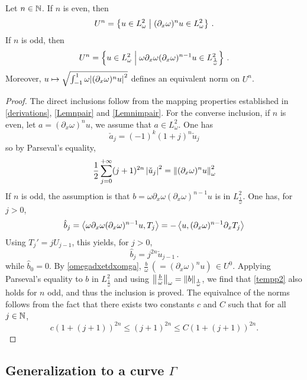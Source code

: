 \documentclass[a4paper]{article}
\begin{document}
\begin{Lem} Let $n \in \mathbb{N}$. If $n$ is even, then
	\[U^n = \left\{u \in L^2_\omega\mathrel{}\middle|\mathrel{}(\partial_x \omega)^n u \in L^2_\omega\right\}\,.\]
	If $n$ is odd, then
	\[U^n = \left\{u \in L^2_\omega\mathrel{}\middle|\mathrel{}\omega \partial_x\omega (\partial_x \omega)^{n-1} u \in L^2_\frac{1}{\omega}\right\}\,.\]	
	Moreover, $u \mapsto \sqrt{\int_{-1}^{1} \omega {\left\lvert ( \partial_x \omega )^nu \right\rvert^2}}$ defines an equivalent norm on $U^n$. 
\end{Lem}
\begin{proof}
	The direct inclusions follow from the mapping properties established in \autoref{derivations}, \autoref{Lemnpair} and \autoref{Lemnimpair}. For the converse inclusion, if $n$ is even, let $a = (\partial_x \omega)^n u$, we assume that $a \in L^2_\omega$. One has 
	\[\check{a}_j = (-1)^k \left(1+j\right)^{n}\check{u}_j\] 
	so by Parseval's equality, 
	\begin{equation}
		\label{tempp2}
		\frac{1}{2}\sum_{j = 0 }^{+ \infty} (j+1)^{2n} \left\lvert \check{u}_j \right\rvert^2 = \left\|(\partial_x \omega)^nu\right\|^2_\omega
	\end{equation}
	If $n$ is odd, the assumption is that $b = \omega \partial_x \omega(\partial_x \omega)^{n-1}u$ is in $L^2_\frac{1}{\omega}$. One has, for $j > 0$, 
	\[\hat{b}_j = \left\langle \omega \partial_x \omega(\partial_x \omega)^{n-1}u,T_j\right\rangle = -\left\langle u,(\partial_x \omega)^{n-1} \partial_x T_j\right\rangle\]
	Using $T_j' = jU_{j-1}$, this yields, for $j > 0$,
	\[\hat{b}_j = j^{2n} \check{u}_{j-1}\,.\]
	while $\hat{b}_0 = 0$. By \autoref{omegadxetdxomga}, $\frac{b}{\omega} \,(= (\partial_x \omega)^n u)\, \in U^0$. Applying Parseval's equality to $b$ in $L^2_\frac{1}{\omega}$ and using $\left\|\frac{b}{\omega}\right\|_\omega = \left\|b\right\|_\frac{1}{\omega}$, we find that \eqref{tempp2} also holds for $n$ odd, and thus the inclusion is proved. The equivalnce of the norms follows from the fact that there exists two constants $c$ and $C$ such that for all $j \in \mathbb{N}$, 
	\[c(1 + (j + 1))^{2n} \leq (j + 1)^{2n}  \leq C(1 + (j+1))^{2n}.\]
	\end{proof}
	
\subsection{Generalization to a curve $\Gamma$}
\end{document}
